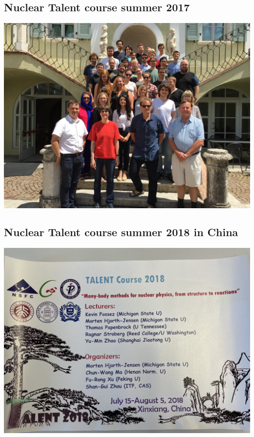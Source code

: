 \documentclass[%
oneside,                 %
final,                   %
10pt]{article}
\begin{document}
\vspace{6mm}

\subsection{Nuclear Talent course summer 2017}

\vspace{6mm}

\centerline{\includegraphics[width=1.0\linewidth]{Photos/talent2017.jpg}}

\vspace{6mm}

\subsection{Nuclear Talent course summer 2018 in China}

\vspace{6mm}

\centerline{\includegraphics[width=1.0\linewidth]{Photos/talent2018.jpeg}}
\end{document}
